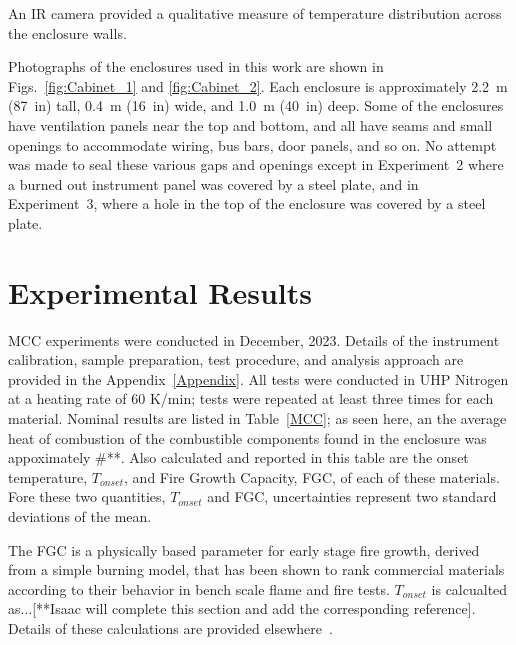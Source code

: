 \documentclass[12pt]{article}
\begin{document}
An IR camera provided a qualitative measure of temperature distribution across the enclosure walls.

Photographs of the enclosures used in this work are shown in Figs.~\ref{fig:Cabinet_1} and \ref{fig:Cabinet_2}. Each enclosure is approximately 2.2~m (87~in) tall, 0.4~m (16~in) wide, and 1.0~m (40~in) deep. Some of the enclosures have ventilation panels near the top and bottom, and all have seams and small openings to accommodate wiring, bus bars, door panels, and so on. No attempt was made to seal these various gaps and openings except in Experiment~2 where a burned out instrument panel was covered by a steel plate, and in Experiment~3, where a hole in the top of the enclosure was covered by a steel plate.



\clearpage


\section{Experimental Results}
\label{sec:results}
MCC experiments were conducted in December, 2023. Details of the instrument calibration, sample preparation, test procedure, and analysis approach are provided in the Appendix~\ref{Appendix}. All tests were conducted in UHP Nitrogen at a heating rate of 60 K/min; tests were repeated at least three times for each material. Nominal results are listed in Table~\ref{MCC}; as seen here, an the average heat of combustion of the combustible components found in the enclosure was appoximately \#**. Also calculated and reported in this table are the onset temperature, $T_{onset}$, and Fire Growth Capacity, FGC, of each of these materials. Fore these two quantities, $T_{onset}$ and FGC, uncertainties represent two standard deviations of the mean.

The FGC is a physically based parameter for early stage fire growth, derived from a simple burning model, that has been shown to rank commercial materials according to their behavior in bench scale flame and fire tests. $T_{onset}$  is calcualted as...[**Isaac will complete this section and add the corresponding reference]. Details of these calculations are provided elsewhere~\cite{DOT/FAA/TC-20/30}.
\end{document}

